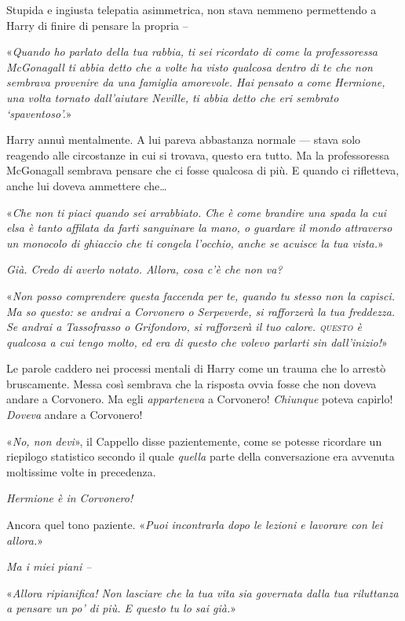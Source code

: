 Stupida e ingiusta telepatia asimmetrica, non stava nemmeno permettendo a Harry di finire di pensare la propria –

«\textit{Quando ho parlato della tua rabbia, ti sei ricordato di come la professoressa McGonagall ti abbia detto che a volte ha visto qualcosa dentro di te che non sembrava provenire da una famiglia amorevole. Hai pensato a come Hermione, una volta tornato dall’aiutare Neville, ti abbia detto che eri sembrato ‘spaventoso’.}»

Harry annuì mentalmente. A lui pareva abbastanza normale — stava solo reagendo alle circostanze in cui si trovava, questo era tutto. Ma la professoressa McGonagall sembrava pensare che ci fosse qualcosa di più. E quando ci rifletteva, anche lui doveva ammettere che…

«\textit{Che non ti piaci quando sei arrabbiato. Che è come brandire una spada la cui elsa è tanto affilata da farti sanguinare la mano, o guardare il mondo attraverso un monocolo di ghiaccio che ti congela l’occhio, anche se acuisce la tua vista.}»

\textit{Già. Credo di averlo notato. Allora, cosa c’è che non va?}

«\textit{Non posso comprendere questa faccenda per te, quando tu stesso non la capisci. Ma so questo: se andrai a Corvonero o Serpeverde, si rafforzerà la tua freddezza. Se andrai a Tassofrasso o Grifondoro, si rafforzerà il tuo calore. \textsc{questo} è qualcosa a cui tengo molto, ed era di questo che volevo parlarti sin dall’inizio!}»

Le parole caddero nei processi mentali di Harry come un trauma che lo arrestò bruscamente. Messa così sembrava che la risposta ovvia fosse che non doveva andare a Corvonero. Ma egli \textit{apparteneva} a Corvonero! \textit{Chiunque} poteva capirlo! \textit{Doveva} andare a Corvonero!

«\textit{No, non devi}», il Cappello disse pazientemente, come se potesse ricordare un riepilogo statistico secondo il quale \textit{quella} parte della conversazione era avvenuta moltissime volte in precedenza.

\textit{Hermione è in Corvonero!}

Ancora quel tono paziente. «\textit{Puoi incontrarla dopo le lezioni e lavorare con lei allora.}»

\textit{Ma i miei piani –}

«\textit{Allora ripianifica! Non lasciare che la tua vita sia governata dalla tua riluttanza a pensare un po’ di più. E questo tu lo sai già.}»

